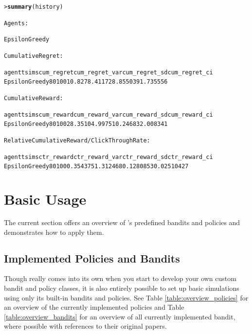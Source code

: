 \documentclass{jss}\usepackage[]{graphicx}\usepackage[]{color}
\makeatletter
\newcommand{\hlkwd}[1]{\textcolor[rgb]{0.737,0.353,0.396}{\textbf{#1}}}%
\newenvironment{kframe}{%
 \def\at@end@of@kframe{}%
 \ifinner\ifhmode%
  \def\at@end@of@kframe{\end{minipage}}%
  \begin{minipage}{\columnwidth}%
 \fi\fi%
 \def\FrameCommand##1{\hskip\@totalleftmargin \hskip-\fboxsep
 \colorbox{shadecolor}{##1}\hskip-\fboxsep
     \hskip-\linewidth \hskip-\@totalleftmargin \hskip\columnwidth}%
 \MakeFramed {\advance\hsize-\width
   \@totalleftmargin\z@ \linewidth\hsize
   \@setminipage}}%
 {\par\unskip\endMakeFramed%
 \at@end@of@kframe}
\newenvironment{knitrout}{}{} %
\makeatother
\begin{document}
\begin{knitrout}\small
{}\color{fgcolor}\begin{kframe}
\begin{alltt}
> \hlkwd{summary}(history)

Agents:

  EpsilonGreedy

Cumulative Regret:

         agent  t sims cum_regret cum_regret_var cum_regret_sd cum_regret_ci
 EpsilonGreedy 80  100      10.82       78.41172      8.855039      1.735556


Cumulative Reward:

         agent  t sims cum_reward cum_reward_var cum_reward_sd cum_reward_ci
 EpsilonGreedy 80  100      28.35       104.9975      10.24683      2.008341


Relative Cumulative Reward / Click Through Rate:

         agent  t sims ctr_reward ctr_reward_var ctr_reward_sd ctr_reward_ci
 EpsilonGreedy 80  100   0.354375       1.312468     0.1280853    0.02510427
\end{alltt}
\end{kframe}
\end{knitrout}



\section{Basic Usage}

The current section offers an overview of 's predefined bandits and policies and demonstrates how to apply them.

\subsection{Implemented Policies and Bandits}

Though  really comes into its own when you start to develop your own custom bandit and policy classes, it is also entirely possible to set up basic simulations using only its built-in bandits and policies. See Table \ref{table:overview_policies} for an overview of the currently implemented policies and Table \ref{table:overview_bandits} for an overview of all currently implemented bandit, where possible with references to their original papers.
\end{document}
